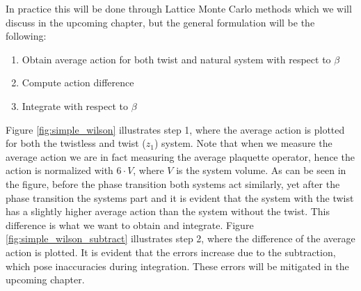 \documentclass[english,twoside,openright]{UH_TCM_MSc}
\begin{document}
In practice this will be done through Lattice Monte Carlo methods which we will discuss in the upcoming chapter, but the general formulation will be the following:
\begin{enumerate}
    \item Obtain average action for both twist and natural system with respect to $\beta$
    \item Compute action difference
    \item Integrate with respect to $\beta$
\end{enumerate}
Figure \ref{fig:simple_wilson} illustrates step 1, where the average action is plotted for both the twistless and twist ($z_1$) system. Note that when we measure the average action we are in fact measuring the average plaquette operator, hence the action is normalized with $6\cdot V$, where $V$ is the system volume. As can be seen in the figure, before the phase transition both systems act similarly, yet after the phase transition the systems part and it is evident that the system with the twist has a slightly higher average action than the system without the twist. This difference is what we want to obtain and integrate. Figure \ref{fig:simple_wilson_subtract} illustrates step 2, where the difference of the average action is plotted. It is evident that the errors increase due to the subtraction, which pose inaccuracies during integration. These errors will be mitigated in the upcoming chapter.
\end{document}
